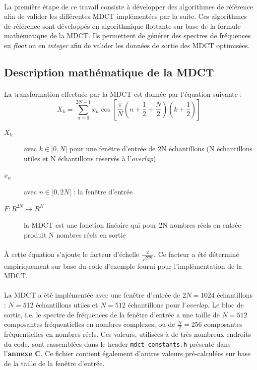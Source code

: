 \documentclass{article}
\begin{document}
    \paragraph{}
    La première étape de ce travail consiste à développer des algorithmes de référence afin de valider les différentes MDCT implémentées par la suite. Ces algorithmes de référence sont développés en algorithmique flottante sur base de la formule mathématique de la MDCT. Ils permettent de générer des spectres de fréquences en \emph{float} ou en \emph{integer} afin de valider les données de sortie des MDCT optimisées.


    \subsection{Description mathématique de la MDCT}
    \label{sec:desc-math}

    \paragraph{}
    La transformation effectuée par la MDCT est donnée par l'équation suivante\cite{wiki:MDCT} :
    $$X_k = \sum_{n=0}^{2N-1} x_n \cos \left[ \frac{\pi}{N} \left( n + \frac{1}{2} + \frac{N}{2} \right) \left( k + \frac{1}{2} \right) \right]$$
    \begin{description}
        \item[$X_k$] avec $k \in [0, N[$ pour une fenêtre d'entrée de 2N échantillons (N échantillons utiles et N échantillons réservés à l'\emph{overlap})
        \item[$x_n$] avec $n \in [0, 2N[$ : la fenêtre d'entrée
        \item[$F: R^{2N} \rightarrow R^N$] la MDCT est une fonction linéaire qui pour 2N nombres réels en entrée produit N nombres réels en sortie
    \end{description}\label{test}

    \paragraph{}
    À cette équation s'ajoute le facteur d'échelle $\frac{2}{\sqrt{2N}}$. Ce facteur a été déterminé empiriquement sur base du code d'exemple fourni pour l'implémentation de la MDCT.

    \paragraph{}
    La MDCT a été implémentée avec une fenêtre d'entrée de $2N = 1024$ échantillons : $N = 512$ échantillons utiles et $N = 512$ échantillons pour l'\emph{overlap}. Le bloc de sortie, i.e. le spectre de fréquences de la fenêtre d'entrée a une taille de $N = 512$ composantes fréquentielles en nombres complexes, ou de $\frac{N}{2} = 256$ composantes fréquentielles en nombres réels. Ces valeurs, utilisées à de très nombreux endroits du code, sont rassemblées dans le header \texttt{mdct\_constants.h} présenté dans l'\textbf{annexe C}. Ce fichier contient également d'autres valeurs pré-calculées sur base de la taille de la fenêtre d'entrée.
\end{document}
